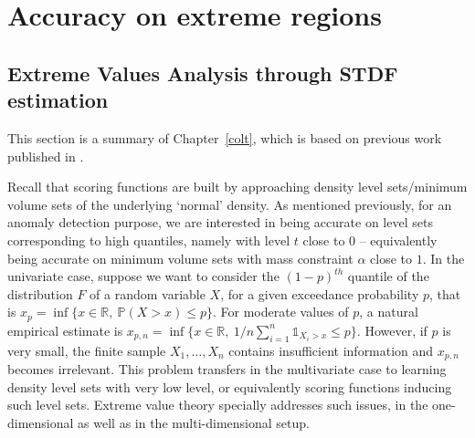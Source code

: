






\section{Accuracy on extreme regions}
\label{resume_fr:extreme}
\subsection{Extreme Values Analysis through STDF estimation}
\label{resume_fr:stdf}
This section is a summary of Chapter~\ref{colt}, which is based on previous work published in \cite{COLT15}.

Recall that scoring functions are built
by approaching density level sets/minimum volume sets of the underlying `normal' density. As mentioned previously, for an anomaly detection purpose, we are interested in being accurate on level sets corresponding to high quantiles, namely with level $t$ close to $0$ -- equivalently being accurate on minimum volume sets with mass constraint $\alpha$ close to $1$.  
%
In the univariate case, suppose we want to consider the $(1-p)^{th}$ quantile of the distribution $F$ of a random variable $X$, for a given exceedance probability $p$, that is $x_p = \inf\{x \in \mathbb{R},~ \mathbb{P}(X > x) \le p\}$. For moderate values of $p$, a natural empirical estimate is $x_{p,n} = \inf\{x \in \mathbb{R},~ 1/n \sum_{i=1}^n \mathds{1}_{X_i > x}\le p\}$.
However,  if $p$ is very small, the finite  sample $X_1,\ldots, X_n$  contains insufficient information and $x_{p,n}$ becomes irrelevant.
%
This problem transfers in the multivariate case to learning density level sets with very low level, or equivalently scoring functions inducing such level sets.
%
Extreme value theory specially addresses such issues, in the one-dimensional as well as in the multi-dimensional setup.



